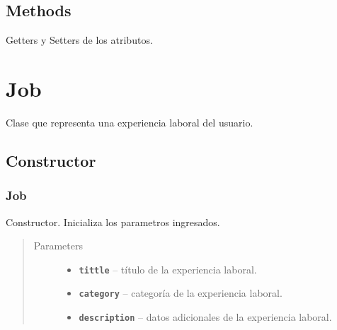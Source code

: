 \documentclass[letterpaper,10pt,english]{sphinxmanual}
\begin{document}
\subsection{Methods}
\label{Model/Skill:methods}
Getters y Setters de los atributos.


\section{Job}
\label{Model/Job:job}\label{Model/Job::doc}

\begin{fulllineitems}
\label{Model/Job:com.fiuba.tallerii.jobify.Job}
Clase que representa una experiencia laboral del usuario.

\end{fulllineitems}



\subsection{Constructor}
\label{Model/Job:constructor}

\subsubsection{Job}
\label{Model/Job:id1}

\begin{fulllineitems}
\label{Model/Job:com.fiuba.tallerii.jobify.Job.Skill(String, String, String)}
Constructor. Inicializa los parametros ingresados.
\begin{quote}\begin{description}
\item[{Parameters}] \leavevmode\begin{itemize}
\item {} 
\textbf{\texttt{tittle}} -- título de la experiencia laboral.

\item {} 
\textbf{\texttt{category}} -- categoría de la experiencia laboral.

\item {} 
\textbf{\texttt{description}} -- datos adicionales de la experiencia laboral.

\end{itemize}

\end{description}\end{quote}

\end{fulllineitems}
\end{document}
